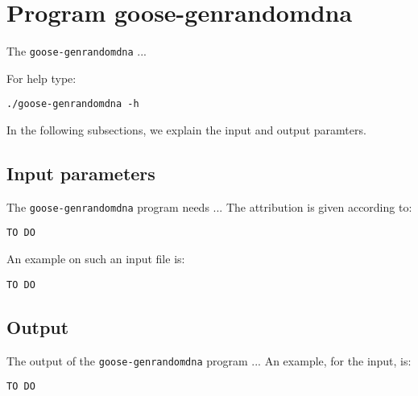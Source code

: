 \section{Program goose-genrandomdna}
The \texttt{goose-genrandomdna} ...

For help type:
\begin{lstlisting}
./goose-genrandomdna -h
\end{lstlisting}
In the following subsections, we explain the input and output paramters.

\subsection{Input parameters}

The \texttt{goose-genrandomdna} program needs ...
The attribution is given according to:
\begin{lstlisting}
TO DO
\end{lstlisting}

An example on such an input file is:
\begin{lstlisting}
TO DO
\end{lstlisting}

\subsection{Output}
The output of the \texttt{goose-genrandomdna} program ...
An example, for the input, is:
\begin{lstlisting}
TO DO
\end{lstlisting}
